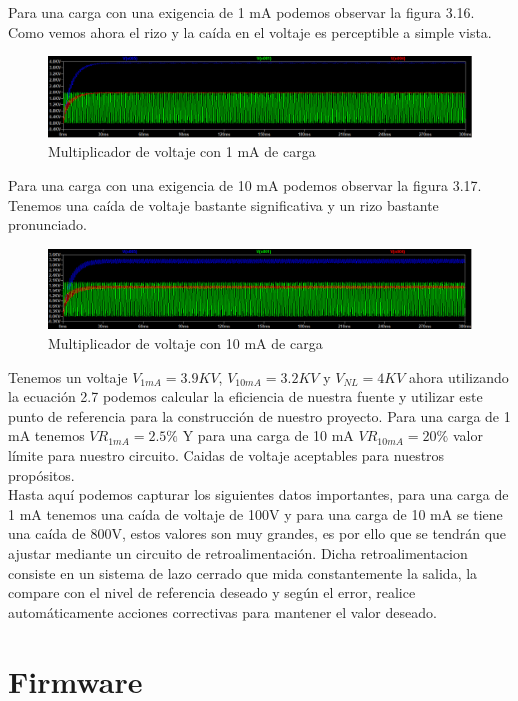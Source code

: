 Para una carga con una exigencia de 1 mA podemos observar la figura 3.16. Como vemos ahora el rizo y la caída en el voltaje es perceptible a simple vista.


\begin{figure}[H]
\centering
\includegraphics[width=12cm]{Capitulo3/figs/1ma.png}
\caption{Multiplicador de voltaje con 1 mA de carga}
\end{figure}

Para una carga con una exigencia de 10 mA podemos observar la figura 3.17. Tenemos una caída de voltaje bastante significativa y un rizo bastante pronunciado.


\begin{figure}[H]
\centering
\includegraphics[width=12cm]{Capitulo3/figs/10ma.png}
\caption{Multiplicador de voltaje con 10 mA de carga}
\end{figure}

Tenemos un voltaje $V_{1mA}=3.9KV$, $V_{10mA}=3.2KV$ y $V_{NL}=4KV$ ahora utilizando la ecuación 2.7 podemos calcular la eficiencia de nuestra fuente y utilizar este punto de referencia para la construcción de nuestro proyecto. Para una carga de 1 mA tenemos $VR_{1mA}=2.5\%$ Y para una carga de 10 mA $VR_{10mA}=20\%$ valor límite para nuestro circuito. Caidas de voltaje aceptables para nuestros propósitos.\\

Hasta aquí podemos capturar los siguientes datos importantes, para una carga de 1 mA tenemos una caída de voltaje de 100V y para una carga de 10 mA se tiene una caída de 800V, estos valores son muy grandes, es por ello que se tendrán que ajustar mediante un circuito de retroalimentación. Dicha retroalimentacion consiste en un sistema de lazo cerrado que mida constantemente la salida, la compare con el nivel de referencia deseado y según el error, realice automáticamente acciones correctivas para mantener el valor deseado. 
\newpage

\section{Firmware}

